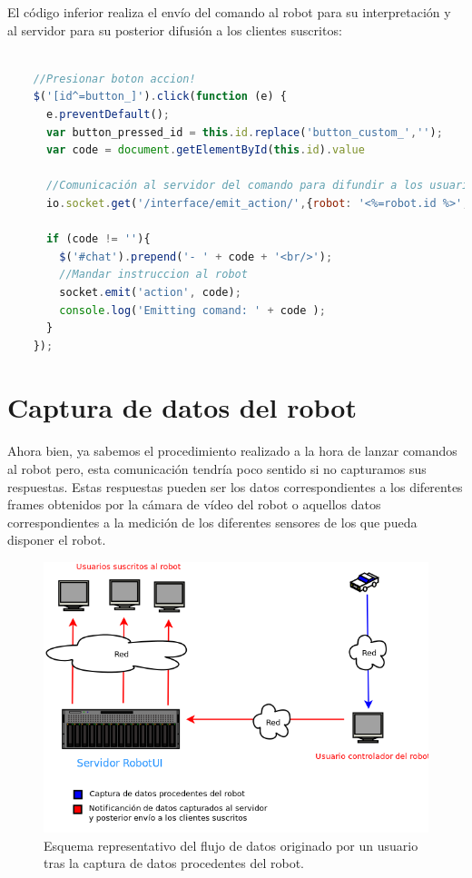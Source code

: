   
El código inferior realiza el envío del comando al robot para su interpretación y al servidor para su posterior difusión a los clientes suscritos:\\
 
 \begin{lstlisting}[language=JavaScript]
 
    //Presionar boton accion!
    $('[id^=button_]').click(function (e) {
      e.preventDefault();
      var button_pressed_id = this.id.replace('button_custom_','');
      var code = document.getElementById(this.id).value

      //Comunicación al servidor del comando para difundir a los usuarios espectadores
      io.socket.get('/interface/emit_action/',{robot: '<%=robot.id %>', id: button_pressed_id, msg: code })

      if (code != ''){
        $('#chat').prepend('- ' + code + '<br/>');
        //Mandar instruccion al robot
        socket.emit('action', code);
        console.log('Emitting comand: ' + code );
      }
    });

 \end{lstlisting}
 
 
\section{Captura de datos del robot}

 Ahora bien, ya sabemos el procedimiento realizado a la hora de lanzar comandos al robot pero, esta comunicación tendría poco sentido si no capturamos sus respuestas. Estas respuestas pueden ser los datos correspondientes
 a los diferentes frames obtenidos por la cámara de vídeo del robot o aquellos datos correspondientes a la medición de los diferentes sensores de los que pueda disponer el robot.

 
 \begin{figure}[H]
  \begin{center}
    \includegraphics[scale=0.5]{diagramas/flujo_comunicaciones_captura.png}
  \end{center}
  \caption{Esquema representativo del flujo de datos originado por un usuario tras la captura de datos procedentes del robot.}
  \label{diagram:conexiones-controlador}
\end{figure}
 
